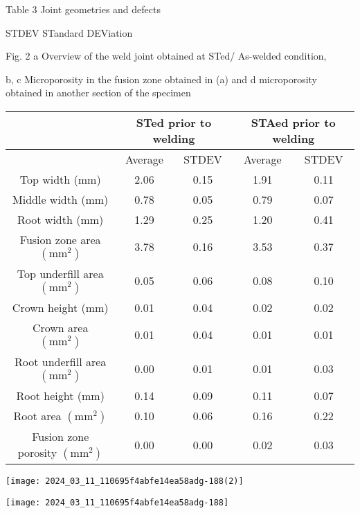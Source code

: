 \documentclass[10pt]{article}
\begin{document}
Table 3 Joint geometries and defects

STDEV STandard DEViation

Fig. 2 a Overview of the weld joint obtained at STed/ As-welded condition,

b, c Microporosity in the fusion zone obtained in (a) and d microporosity obtained in another section of the specimen

\begin{center}
\begin{tabular}{|c|c|c|c|c|}
\hline
 & \multicolumn{2}{|c|}{STed prior to welding} & \multicolumn{2}{|c|}{STAed prior to welding} \\
\hline
 & Average & STDEV & Average & STDEV \\
\hline
Top width (mm) & 2.06 & 0.15 & 1.91 & 0.11 \\
\hline
Middle width (mm) & 0.78 & 0.05 & 0.79 & 0.07 \\
\hline
Root width (mm) & 1.29 & 0.25 & 1.20 & 0.41 \\
\hline
Fusion zone area $\left(\mathrm{mm}^{2}\right)$ & 3.78 & 0.16 & 3.53 & 0.37 \\
\hline
Top underfill area $\left(\mathrm{mm}^{2}\right)$ & 0.05 & 0.06 & 0.08 & 0.10 \\
\hline
Crown height (mm) & 0.01 & 0.04 & 0.02 & 0.02 \\
\hline
Crown area $\left(\mathrm{mm}^{2}\right)$ & 0.01 & 0.04 & 0.01 & 0.01 \\
\hline
Root underfill area $\left(\mathrm{mm}^{2}\right)$ & 0.00 & 0.01 & 0.01 & 0.03 \\
\hline
Root height (mm) & 0.14 & 0.09 & 0.11 & 0.07 \\
\hline
Root area $\left(\mathrm{mm}^{2}\right)$ & 0.10 & 0.06 & 0.16 & 0.22 \\
\hline
Fusion zone porosity $\left(\mathrm{mm}^{2}\right)$ & 0.00 & 0.00 & 0.02 & 0.03 \\
\hline
\end{tabular}
\end{center}

\begin{center}
\texttt{[image: 2024\_03\_11\_110695f4abfe14ea58adg-188(2)]}
\end{center}

\begin{center}
\texttt{[image: 2024\_03\_11\_110695f4abfe14ea58adg-188]}
\end{center}
\end{document}
